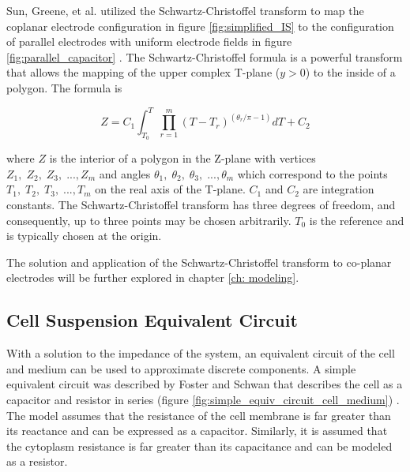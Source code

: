  
    \par Sun, Greene, et al. utilized the Schwartz-Christoffel transform to map the coplanar electrode configuration in figure \ref{fig:simplified_IS} to the configuration of parallel electrodes with uniform electrode fields in figure \ref{fig:parallel_capacitor} \cite{sun_analytical_2007}. The Schwartz-Christoffel formula is a powerful transform that allows the mapping of the upper complex T-plane ($y>0$) to the inside of a polygon. The formula is
    
    \begin{equation}
        Z = C_1 \int_{T_0}^T \prod^m_{r=1} (T - T_r)^{(\theta_r/\pi - 1)} dT + C_2
    \end{equation}
    
    \noindent where $Z$ is the interior of a polygon in the Z-plane with vertices $Z_1,\;Z_2,\;Z_3,\; ...,Z_m$ and angles $\theta_1,\;\theta_2,\;\theta_3,\; ...,\theta_m$ which correspond to the points $T_1,\;T_2,\;T_3,\; ...,T_m$ on the real axis of the T-plane. $C_1$ and $C_2$ are integration constants. The Schwartz-Christoffel transform has three degrees of freedom, and consequently, up to three points may be chosen arbitrarily. $T_0$ is the reference and is typically chosen at the origin.
    
    \par The solution and application of the Schwartz-Christoffel transform to co-planar electrodes will be further explored in chapter \ref{ch: modeling}.
    
    \FloatBarrier
    
    
 
    
 \subsection{Cell Suspension Equivalent Circuit}
 \label{sec: cell_suspension_equiv_circ}
 \par With a solution to the impedance of the system, an equivalent circuit of the cell and medium can be used to approximate discrete components. A simple equivalent circuit was described by Foster and Schwan that describes the cell as a capacitor and resistor in series (figure \ref{fig:simple_equiv_circuit_cell_medium}) \cite{schwan_electrical_1994}. The model assumes that the resistance of the cell membrane is far greater than its reactance and can be expressed as a capacitor. Similarly, it is assumed that the cytoplasm resistance is far greater than its capacitance and can be modeled as a resistor.
 
